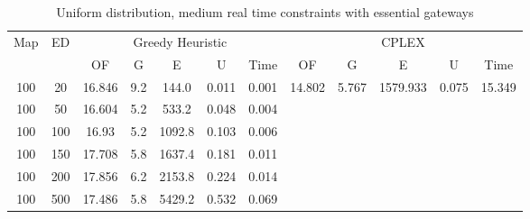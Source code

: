 \begin{table}[htb]
	\centering
	\begin{tabular}{|c|c|c|c|c|c|c|c|c|c|c|c|}
		\hline
		\multirow{2}{*}{Map} & \multirow{2}{*}{ED} & \multicolumn{5}{c|}{Greedy Heuristic} & \multicolumn{5}{c|}{CPLEX}\\ 
		\cline{3-12}
&& OF & G & E & U & Time & OF & G & E & U & Time\\ 
		\hline
		100 & 20 & 16.846 & 9.2 & 144.0 & 0.011 & 0.001 & 14.802 & 5.767 & 1579.933 & 0.075 & 15.349 \\ 
		100 & 50 & 16.604 & 5.2 & 533.2 & 0.048 & 0.004 & & & & &  \\ 
		100 & 100 & 16.93 & 5.2 & 1092.8 & 0.103 & 0.006 & & & & &  \\ 
		100 & 150 & 17.708 & 5.8 & 1637.4 & 0.181 & 0.011 & & & & &  \\ 
		100 & 200 & 17.856 & 6.2 & 2153.8 & 0.224 & 0.014 & & & & &  \\ 
		100 & 500 & 17.486 & 5.8 & 5429.2 & 0.532 & 0.069 & & & & &  \\ 
		\hline 
	\end{tabular} 
	\caption{Uniform distribution, medium real time constraints with essential gateways} 
	\label{tab:unif_medium_esc} 
\end{table} 

